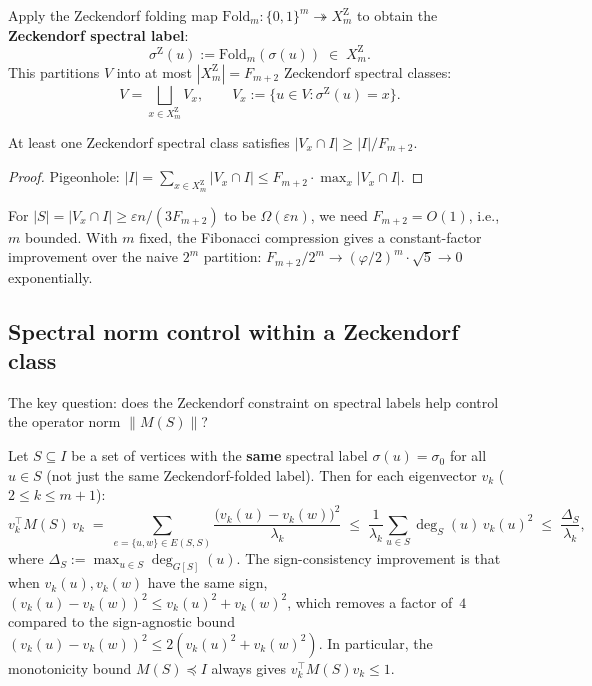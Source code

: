 \begin{definition}
Apply the Zeckendorf folding map
$\mathrm{Fold}_m\colon\{0,1\}^m\twoheadrightarrow X_m^{\mathrm{Z}}$
to obtain the \textbf{Zeckendorf spectral label}:
\[
\sigma^{\mathrm{Z}}(u) := \mathrm{Fold}_m(\sigma(u))
\;\in\; X_m^{\mathrm{Z}}.
\]
This partitions $V$ into at most $|X_m^{\mathrm{Z}}|=F_{m+2}$
Zeckendorf spectral classes:
\[
V = \bigsqcup_{x\in X_m^{\mathrm{Z}}} V_x,
\qquad V_x := \{u\in V:\sigma^{\mathrm{Z}}(u)=x\}.
\]
\end{definition}

\begin{lemma}\label{lem:omega-q6-pigeonhole}
At least one Zeckendorf spectral class satisfies
$|V_x\cap I| \ge |I|/F_{m+2}$.
\end{lemma}

\begin{proof}
Pigeonhole: $|I|=\sum_{x\in X_m^{\mathrm{Z}}}|V_x\cap I|
\le F_{m+2}\cdot\max_x|V_x\cap I|$.
\end{proof}

For $|S|=|V_x\cap I|\ge\varepsilon n/(3F_{m+2})$ to be
$\Omega(\varepsilon n)$, we need $F_{m+2}=O(1)$, i.e., $m$ bounded.
With $m$ fixed, the Fibonacci compression gives a constant-factor
improvement over the naive $2^m$ partition:
$F_{m+2}/2^m \to (\varphi/2)^m\cdot\sqrt{5}\to 0$ exponentially.

\subsection{Spectral norm control within a Zeckendorf class}

The key question: does the Zeckendorf constraint on spectral labels
help control the operator norm $\|M(S)\|$?

\begin{proposition}\label{prop:omega-q6-sign}
Let $S\subseteq I$ be a set of vertices with the \textbf{same}
spectral label $\sigma(u)=\sigma_0$ for all $u\in S$
(not just the same Zeckendorf-folded label).
Then for each eigenvector $v_k$ ($2\le k\le m+1$):
\[
v_k^\top M(S)\,v_k
\;=\; \sum_{e=\{u,w\}\in E(S,S)}
\frac{\bigl(v_k(u)-v_k(w)\bigr)^2}{\lambda_k}
\;\le\; \frac{1}{\lambda_k}\sum_{u\in S}\deg_S(u)\,v_k(u)^2
\;\le\; \frac{\Delta_S}{\lambda_k},
\]
where $\Delta_S:=\max_{u\in S}\deg_{G[S]}(u)$.
The sign-consistency improvement is that when
$v_k(u),v_k(w)$ have the same sign,
$(v_k(u)-v_k(w))^2\le v_k(u)^2+v_k(w)^2$,
which removes a factor of~$4$ compared to the
sign-agnostic bound $(v_k(u)-v_k(w))^2\le 2(v_k(u)^2+v_k(w)^2)$.
In particular, the monotonicity bound $M(S)\preceq I$
always gives $v_k^\top M(S)v_k\le 1$.
\end{proposition}

